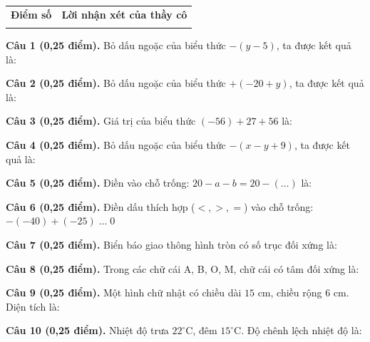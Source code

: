 \documentclass[12pt,a4paper]{article}
\begin{document}
\vspace{1.0mm}

\noindent
\begin{tabularx}{\linewidth}{|p{3.2cm}|X|}
\hline
\centering\textbf{Điểm số} & \centering\textbf{Lời nhận xét của thầy cô} \tabularnewline
\rule{0pt}{1.8cm} & \\
\hline
\end{tabularx}

\vspace{1.0mm}
\noindent\textbf{Câu 1 (0,25 điểm).} Bỏ dấu ngoặc của biểu thức $-(y - 5)$, ta được kết quả là: \par\vspace{0.25mm}
\noindent\textbf{Câu 2 (0,25 điểm).} Bỏ dấu ngoặc của biểu thức $+(-20 + y)$, ta được kết quả là: \par\vspace{0.25mm}
\noindent\textbf{Câu 3 (0,25 điểm).} Giá trị của biểu thức $(-56) + 27 + 56$ là: \par\vspace{0.25mm}
\noindent\textbf{Câu 4 (0,25 điểm).} Bỏ dấu ngoặc của biểu thức $-(x - y + 9)$, ta được kết quả là: \par\vspace{0.25mm}
\noindent\textbf{Câu 5 (0,25 điểm).} Điền vào chỗ trống: $20 - a - b = 20 - (\dots)$ là: \par\vspace{0.25mm}
\noindent\textbf{Câu 6 (0,25 điểm).} Điền dấu thích hợp ($<, >, =$) vào chỗ trống: $-(-40) + (-25) \; \dots \; 0$ \shortans{>}\par\vspace{0.25mm}
\noindent\textbf{Câu 7 (0,25 điểm).} Biển báo giao thông hình tròn có số trục đối xứng là: \par\vspace{0.25mm}
\noindent\textbf{Câu 8 (0,25 điểm).} Trong các chữ cái A, B, O, M, chữ cái có tâm đối xứng là: \par\vspace{0.25mm}
\noindent\textbf{Câu 9 (0,25 điểm).} Một hình chữ nhật có chiều dài $15\text{ cm}$, chiều rộng $6\text{ cm}$. Diện tích là: \par\vspace{0.25mm}
\noindent\textbf{Câu 10 (0,25 điểm).} Nhiệt độ trưa $22^\circ\text{C}$, đêm $15^\circ\text{C}$. Độ chênh lệch nhiệt độ là: \par\vspace{0.25mm}
\end{document}
